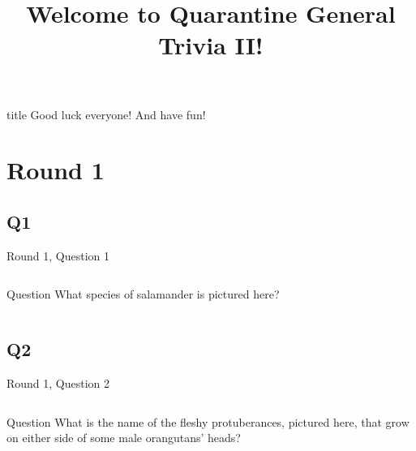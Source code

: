 \documentclass[11pt]{beamer}
\begin{document}
\title{Welcome to Quarantine General Trivia II!\vspace{-0.5in}}
\date{}

\begin{frame}
\titlepage{}
\end{frame}

\begingroup{}
\begin{frame}
\vfill{}
\begin{beamercolorbox}[sep=8pt,center,shadow=true,rounded=true]{title}
Good luck everyone! And have fun!
\end{beamercolorbox}
\vfill{}
\end{frame}
\endgroup{}
\def\thisSectionName{More Plants and Animals}
\section{Round 1}
\subsection*{Q1}
\begin{frame}[t]{Round 1, Question 1}
\begin{columns}[T,totalwidth=\linewidth]
\begin{column}{0.32\linewidth}
\begin{block}{Question}
What species of salamander is pictured here?
\end{block}
\end{column}
\begin{column}{0.65\linewidth}
\begin{center}
\texttt{[image: \{Images/axolotl]}.jpg}
\end{center}
\end{column}
\end{columns}
\end{frame}
\subsection*{Q2}
\begin{frame}[t]{Round 1, Question 2}
\begin{columns}[T,totalwidth=\linewidth]
\begin{column}{0.32\linewidth}
\begin{block}{Question}
What is the name of the fleshy protuberances, pictured here, that grow on either side of some male orangutans' heads?
\end{block}
\end{column}
\begin{column}{0.65\linewidth}
\begin{center}
\texttt{[image: \{Images/orangutan]}.jpg}
\end{center}
\end{column}
\end{columns}
\end{frame}
\end{document}
